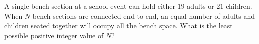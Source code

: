 A single bench section at a school event can hold either $19$ adults or $21$ children. When $N$ bench sections are connected end to end, an equal number of adults and children seated together will occupy all the bench space. What is the least possible positive integer value of $N$?
